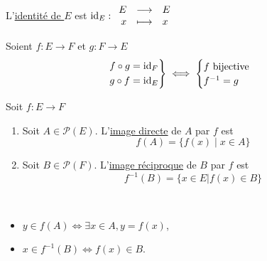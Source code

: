 \begin{defn}
	L'\underline{identité de $E$} est $\operatorname{id}_E : \begin{array}{rcl}
		E &\longrightarrow& E \\
		x &\longmapsto& x
	\end{array}$
\end{defn}

\begin{prop}
	Soient $f: E \to F$ et $g: F \to E$ \\
	\[
		\begin{rcases*}
			f \circ g = \id_F\\
			g \circ f = \id_E
		\end{rcases*}
		\iff \begin{cases}
			f \text{ bijective}\\
			f^{-1}=g
		\end{cases}
	\] 
\end{prop}

\begin{prv}
\end{prv}

\begin{defn}
	Soit $f: E \to F$ 
	\begin{enumerate}
		\item Soit $A \in \mathcal{P}(E)$. L'\underline{image directe} de $A$ par $f$ est \[
				f(A) = \{f(x)  \mid x \in A\} 
			\]
			\vspace{-1.5cm}
			\begin{center}
			\end{center}
			\vspace{-2cm}

		\item Soit $B \in \mathcal{P}(F)$. L'\underline{image réciproque} de $B$ par $f$ est \[
				f^{-1}(B) = \{x \in E | f(x) \in B\}
			\]
			\vspace{-1.5cm}
			\begin{center}
			\end{center}
			\vspace{-2cm}
	\end{enumerate}
\end{defn}

\begin{rmk}~
	\begin{itemize}
		\item $y \in f(A) \iff \exists x \in A, y = f(x)$,
		\item $x \in f^{-1}(B) \iff f(x) \in B$.
	\end{itemize}
\end{rmk}

